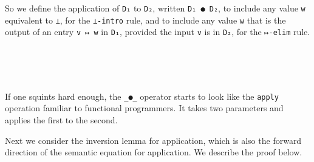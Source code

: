 So we define the application of \texttt{D₁} to \texttt{D₂}, written
\texttt{D₁\ ●\ D₂}, to include any value \texttt{w} equivalent to
\texttt{⊥}, for the \texttt{⊥-intro} rule, and to include any value
\texttt{w} that is the output of an entry \texttt{v\ ↦\ w} in
\texttt{D₁}, provided the input \texttt{v} is in \texttt{D₂}, for the
\texttt{↦-elim} rule.

\begin{fence}
\begin{code}%
\>[0]\AgdaSpace{}%
\AgdaSpace{}%
\<%
\\
%
\\[\AgdaEmptyExtraSkip]%
\>[0]\AgdaSpace{}%
\AgdaSymbol{:}\AgdaSpace{}%
\AgdaSymbol{\}}\AgdaSpace{}%
\AgdaSpace{}%
\AgdaSpace{}%
\AgdaSpace{}%
\AgdaSpace{}%
\AgdaSpace{}%
\AgdaSpace{}%
\AgdaSpace{}%
\AgdaSpace{}%
\<%
\\
\>[0]\AgdaSymbol{(}\AgdaSpace{}%
\AgdaSpace{}%
\AgdaSymbol{)}\AgdaSpace{}%
\AgdaSpace{}%
\AgdaSpace{}%
\AgdaSymbol{=}\AgdaSpace{}%
\AgdaSpace{}%
\AgdaSpace{}%
\AgdaSpace{}%
\AgdaSpace{}%
\AgdaFunction{Σ[}\AgdaSpace{}%
\AgdaSpace{}%
\AgdaSpace{}%
\AgdaSpace{}%
\AgdaFunction{]}\AgdaSymbol{(}\AgdaSpace{}%
\AgdaSpace{}%
\AgdaSpace{}%
\AgdaSymbol{(}\AgdaSpace{}%
\AgdaSpace{}%
\AgdaSymbol{)}\AgdaSpace{}%
\AgdaSpace{}%
\AgdaSpace{}%
\AgdaSpace{}%
\AgdaSpace{}%
\AgdaSymbol{)}\<%
\end{code}
\end{fence}

If one squints hard enough, the \texttt{\_●\_} operator starts to look
like the \texttt{apply} operation familiar to functional programmers. It
takes two parameters and applies the first to the second.

Next we consider the inversion lemma for application, which is also the
forward direction of the semantic equation for application. We describe
the proof below.

